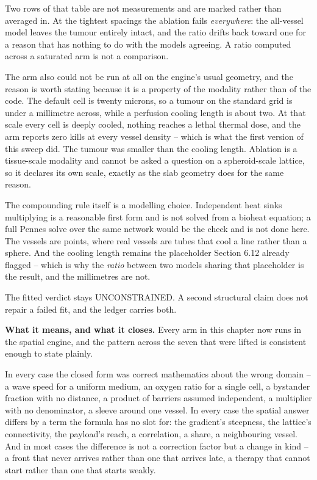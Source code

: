\documentclass[11pt,twoside,openright]{report}
\begin{document}
\begin{refusal}
Two rows of that table are not measurements and are marked rather than averaged in. At the tightest spacings the ablation fails \textit{everywhere}: the all-vessel model leaves the tumour entirely intact, and the ratio drifts back toward one for a reason that has nothing to do with the models agreeing. A ratio computed across a saturated arm is not a comparison.

The arm also could not be run at all on the engine's usual geometry, and the reason is worth stating because it is a property of the modality rather than of the code. The default cell is twenty microns, so a tumour on the standard grid is under a millimetre across, while a perfusion cooling length is about two. At that scale every cell is deeply cooled, nothing reaches a lethal thermal dose, and the arm reports zero kills at every vessel density -- which is what the first version of this sweep did. The tumour was smaller than the cooling length. Ablation is a tissue-scale modality and cannot be asked a question on a spheroid-scale lattice, so it declares its own scale, exactly as the slab geometry does for the same reason.

The compounding rule itself is a modelling choice. Independent heat sinks multiplying is a reasonable first form and is not solved from a bioheat equation; a full Pennes solve over the same network would be the check and is not done here. The vessels are points, where real vessels are tubes that cool a line rather than a sphere. And the cooling length remains the placeholder Section 6.12 already flagged -- which is why the \textit{ratio} between two models sharing that placeholder is the result, and the millimetres are not.

The fitted verdict stays UNCONSTRAINED. A second structural claim does not repair a failed fit, and the ledger carries both.
\end{refusal}

\textbf{What it means, and what it closes.} Every arm in this chapter now runs in the spatial engine, and the pattern across the seven that were lifted is consistent enough to state plainly.

In every case the closed form was correct mathematics about the wrong domain -- a wave speed for a uniform medium, an oxygen ratio for a single cell, a bystander fraction with no distance, a product of barriers assumed independent, a multiplier with no denominator, a sleeve around one vessel. In every case the spatial answer differs by a term the formula has no slot for: the gradient's steepness, the lattice's connectivity, the payload's reach, a correlation, a share, a neighbouring vessel. And in most cases the difference is not a correction factor but a change in kind -- a front that never arrives rather than one that arrives late, a therapy that cannot start rather than one that starts weakly.
\end{document}
